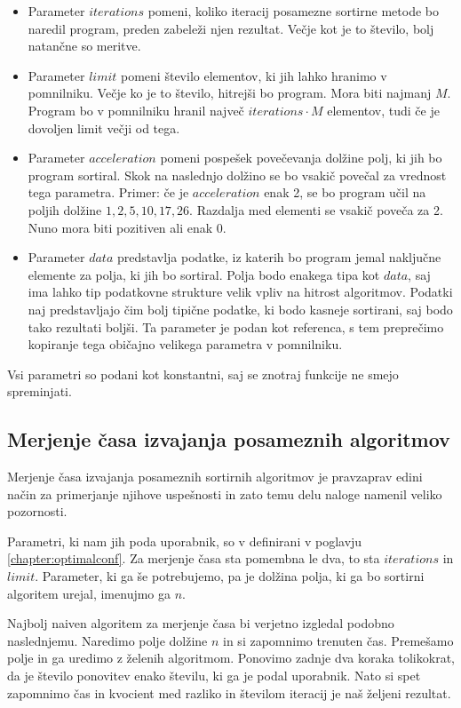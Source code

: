 \documentclass[a4paper,oneside,10pt]{article}
\begin{document}
\begin{itemize}
  \item Parameter $iterations$ pomeni, koliko iteracij posamezne sortirne metode bo naredil
    program, preden zabeleži njen rezultat. Večje kot je to število, bolj natančne so
    meritve.
  \item Parameter $limit$ pomeni število elementov, ki jih lahko hranimo v pomnilniku.
    Večje ko je to število, hitrejši bo program. Mora biti najmanj $M$. Program bo v
    pomnilniku hranil največ $iterations \cdot M$ elementov, tudi če je dovoljen limit večji od
    tega.
  \item Parameter $acceleration$ pomeni pospešek povečevanja dolžine polj, ki jih bo
    program sortiral. Skok na naslednjo dolžino se bo vsakič povečal za vrednost tega
    parametra. Primer: če je $acceleration$ enak 2, se bo program učil na poljih dolžine
    $1, 2, 5, 10, 17, 26$. Razdalja med elementi se vsakič poveča za 2. Nuno mora biti
    pozitiven ali enak $0$.
  \item Parameter $data$ predstavlja podatke, iz katerih bo program jemal naključne
    elemente za polja, ki jih bo sortiral. Polja bodo enakega tipa kot $data$, saj ima
    lahko tip podatkovne strukture velik vpliv na hitrost algoritmov. Podatki naj
    predstavljajo čim bolj tipične podatke, ki bodo kasneje sortirani, saj bodo tako
    rezultati boljši. Ta parameter je podan kot referenca, s tem preprečimo kopiranje
    tega običajno velikega parametra v pomnilniku.
\end{itemize}
Vsi parametri so podani kot konstantni, saj se znotraj funkcije ne smejo spreminjati. 

\subsection{Merjenje časa izvajanja posameznih algoritmov}
Merjenje časa izvajanja posameznih sortirnih algoritmov je pravzaprav edini način za
primerjanje njihove uspešnosti in zato temu delu naloge namenil veliko pozornosti.

Parametri, ki nam jih poda uporabnik, so v definirani v poglavju
\ref{chapter:optimalconf}. Za merjenje časa sta pomembna le dva, to sta $iterations$ in
$limit$. Parameter, ki ga še potrebujemo, pa je dolžina polja, ki ga bo sortirni algoritem
urejal, imenujmo ga $n$.

Najbolj naiven algoritem za merjenje časa bi verjetno izgledal podobno naslednjemu. 
Naredimo polje dolžine $n$ in si zapomnimo trenuten čas. Premešamo polje in ga
uredimo z želenih algoritmom. Ponovimo zadnje dva koraka tolikokrat, da je število
ponovitev enako številu, ki ga je podal uporabnik. Nato si spet zapomnimo čas in kvocient
med razliko in številom iteracij je naš željeni rezultat.
\end{document}
